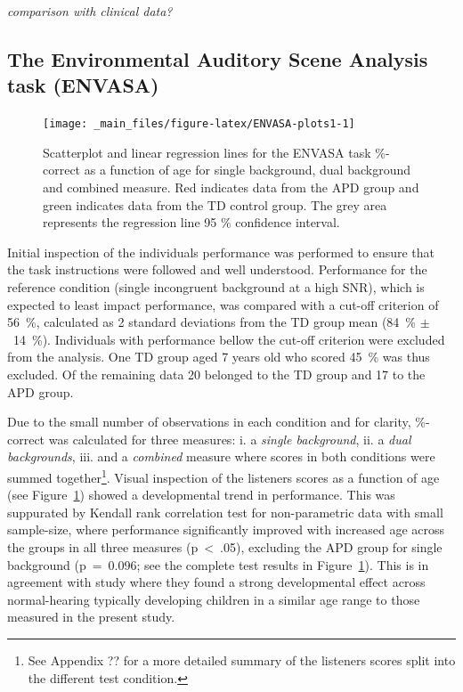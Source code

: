 \documentclass[a4paper, twoside]{templates/ociamthesis}
\begin{document}
\colorbox[HTML]{CCCCFF}{\emph{comparison with clinical data?}}

\hypertarget{the-environmental-auditory-scene-analysis-task-envasa-1}{%
\subsection{The Environmental Auditory Scene Analysis task (ENVASA)}\label{the-environmental-auditory-scene-analysis-task-envasa-1}}

\begin{figure}

{\centering \texttt{[image: \_main\_files/figure-latex/ENVASA-plots1-1]} 

}

\caption{Scatterplot and linear regression lines for the ENVASA task \%-correct as a function of age for single background, dual background and combined measure. Red indicates data from the APD group and green indicates data from the TD control group. The grey area represents the regression line 95 \% confidence interval.}\label{fig:ENVASA-plots1}
\end{figure}

Initial inspection of the individuals performance was performed to ensure that the task instructions were followed and well understood. Performance for the reference condition (single incongruent background at a high SNR), which is expected to least impact performance, was compared with a cut-off criterion of 56~\%, calculated as 2 standard deviations from the TD group mean (84~\% \(\pm\)~14~\%). Individuals with performance bellow the cut-off criterion were excluded from the analysis. One TD group aged 7 years old who scored 45~\% was thus excluded. Of the remaining data 20 belonged to the TD group and 17 to the APD group.

Due to the small number of observations in each condition and for clarity, \%-correct was calculated for three measures: i. a \emph{single background}, ii. a \emph{dual backgrounds}, iii. and a \emph{combined} measure where scores in both conditions were summed together\footnote{See Appendix ?? for a more detailed summary of the listeners scores split into the different test condition.}. Visual inspection of the listeners scores as a function of age (see Figure~\ref{fig:ENVASA-plots1}) showed a developmental trend in performance. This was suppurated by Kendall rank correlation test for non-parametric data with small sample-size, where performance significantly improved with increased age across the groups in all three measures (p~\textless~.05), excluding the APD group for single background (p~=~0.096; see the complete test results in Figure~\ref{fig:ENVASA-plots1}). This is in agreement with \textcite{Krishnan2013} study where they found a strong developmental effect across normal-hearing typically developing children in a similar age range to those measured in the present study.
\end{document}

